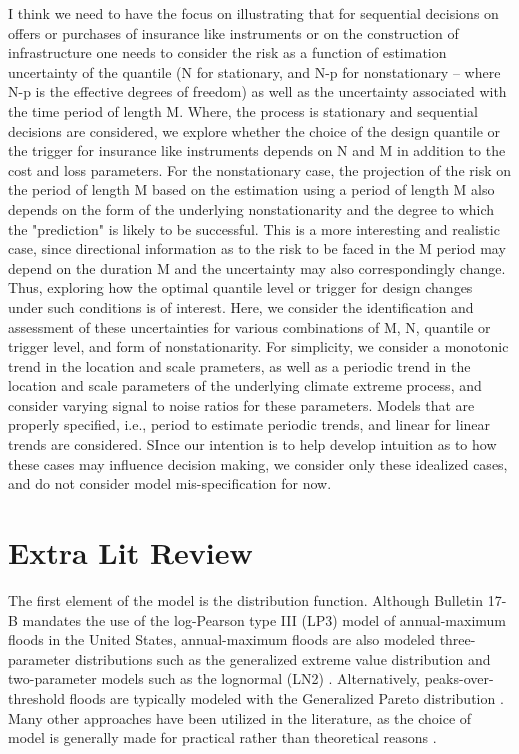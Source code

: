 \documentclass[11pt]{article}
\begin{document}
I think we need to have the focus on illustrating that for sequential decisions on offers or purchases of insurance like instruments or on the construction of infrastructure one needs to consider the risk as a function of estimation uncertainty of the quantile (N for stationary, and N-p for nonstationary -- where N-p is the effective degrees of freedom) as well as the uncertainty associated with the time period of length M. Where, the process is stationary and sequential decisions are considered, we explore whether the choice of the design quantile or the trigger for insurance like instruments depends on N and M in addition to the cost and loss parameters. For the nonstationary case, the projection of the risk on the period of length M based on the estimation using a period of length M also depends on the form of the underlying nonstationarity and the degree to which the "prediction" is likely to be successful. This is a more interesting and realistic case, since directional information as to the risk to be faced in the M period may depend on the duration M and the uncertainty may also correspondingly change. Thus, exploring how the optimal quantile level or trigger for design changes under such conditions is of interest. Here, we consider the identification and assessment of these uncertainties for various combinations of M, N, quantile or trigger level, and form of nonstationarity. For simplicity, we consider a monotonic trend in the location and scale prameters, as well as a periodic trend in the location and scale parameters of the underlying climate extreme process, and consider varying signal to noise ratios for these parameters. Models that are properly specified, i.e., period to estimate periodic trends, and linear for linear trends are considered. SInce our intention is to help develop intuition as to how these cases may influence decision making, we consider only these idealized cases, and do not consider model mis-specification for now.


\section{Extra Lit Review}

The first element of the model is the distribution function.
Although Bulletin 17-B \citep{IACWD1982} mandates the use of the log-Pearson type III (LP3) model of annual-maximum floods in the United States, annual-maximum floods are also modeled three-parameter distributions such as the generalized extreme value distribution and two-parameter models such as the lognormal (LN2) \citep{Vogel1996}.
Alternatively, peaks-over-threshold floods are typically modeled with the Generalized Pareto distribution \citep{Silva2016,Jain2001}.
Many other approaches have been utilized in the literature, as the choice of model is generally made for practical rather than theoretical reasons \citep{Kidson2016}.
\end{document}
